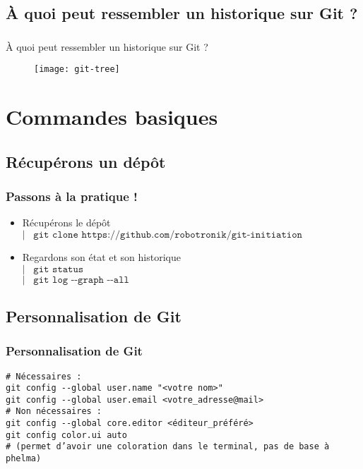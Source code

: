 \documentclass[9pt,a9paper,handout]{beamer}
\newcommand{\command}[1]{$\left|\;\;\;\texttt{#1}\right.$}
\begin{document}
\subsection{À quoi peut ressembler un historique sur Git ?}
\begin{frame}
\frametitle{}{À quoi peut ressembler un historique sur Git ?}
\begin{figure}
    \begin{center}
        \texttt{[image: git-tree]}
    \end{center}
\end{figure}
\end{frame}

\section{Commandes basiques}
\subsection{Récupérons un dépôt}
\begin{frame}
\frametitle{Passons à la pratique !}
\begin{itemize}
    \item Récupérons le dépôt\\\command{git clone https://github.com/robotronik/git-initiation}
    \item Regardons son état et son historique\\
    \command{git status}\\
    \command{git log -{}-graph -{}-all}
\end{itemize}
\end{frame}

\subsection{Personnalisation de Git}
\begin{frame}
\frametitle{Personnalisation de Git}
\texttt{\# Nécessaires :\\
git config -{}-global user.name "<votre nom>"\\
git config -{}-global user.email <votre\_adresse@mail>\\
\# Non nécessaires :\\
git config -{}-global core.editor <éditeur\_préféré>\\
git config color.ui auto\\
\# (permet d'avoir une coloration dans le terminal, pas de base à phelma)
}
\end{frame}
\end{document}

